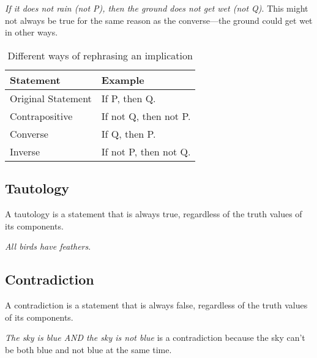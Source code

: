 \documentclass{article}
\theoremstyle{mytheoremstyle}
\theoremstyle{mytheoremstyle}
\theoremstyle{myexamplestyle}
\begin{document}
\begin{example}
    \emph{If it does not rain (not P), then the ground does not get wet (not Q)}. This might not always be true for the same reason as the converse—the ground could get wet in other ways.
\end{example}


\begin{table}[h!]
    \centering
    \begin{tabular}{|l|l|}
        \hline
        \textbf{Statement} & \textbf{Example}      \\\hline
        Original Statement & If P, then Q.         \\\hline
        Contrapositive     & If not Q, then not P. \\\hline
        Converse           & If Q, then P.         \\\hline
        Inverse            & If not P, then not Q. \\\hline
    \end{tabular}
    \caption{Different ways of rephrasing an implication}
\end{table}

\subsection{Tautology}
\begin{definition}
    A tautology is a statement that is always true, regardless of the
    truth values of its components.
\end{definition}

\begin{example}
    \emph{All birds have feathers}.
\end{example}

\subsection{Contradiction}

\begin{definition}
    A contradiction is a statement that is always false, regardless of the truth values of its components.
\end{definition}

\begin{example}
    \emph{The sky is blue AND the sky is not blue} is a
    contradiction because the sky can't be both blue and not blue at
    the same time.
\end{example}
\end{document}
